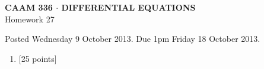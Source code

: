 \documentclass[10pt]{article}
\begin{document}
\vspace*{-5em}
\begin{center}
\large \textsf{\textbf{CAAM 336 $\cdot$ DIFFERENTIAL EQUATIONS}\\[0.5em]
Homework 27 }
\end{center}

Posted Wednesday 9 October 2013.  Due 1pm Friday 18 October 2013.

\begin{enumerate}\addtocounter{enumi}{26}
\item {[25 points]}  
\end{enumerate}
\end{document}
